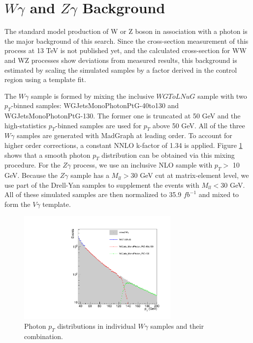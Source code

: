 \documentclass[thesis.tex]{subfiles}
\renewcommand\_{\textunderscore\allowbreak}
\begin{document}
\section{$W\gamma$ and $Z\gamma$ Background}\label{sec:VG}
The standard model production of W or Z boson in association with a photon is the major background of this search. Since the cross-section measurement of this process at 13 TeV is not published yet, and the calculated cross-section for WW and WZ processes show deviations from measured results, this background is estimated by scaling the simulated samples by a factor derived in the control region using a template fit. 

The $W\gamma$ sample is formed by mixing the inclusive $WGToLNuG$ sample with two $p_T$-binned samples: WGJets\_MonoPhoton\_PtG-40to130 and WGJets\_MonoPhoton\_PtG-130. The former one is truncated at 50 GeV and the high-statistics $p_T$-binned samples are used for $p_T$ above 50 GeV. All of the three $W\gamma$ samples are generated with MadGraph at leading order. To account for higher order corrections, a constant NNLO k-factor of 1.34 is applied. Figure \ref{fig:mixWG} shows that a smooth photon $p_{T}$ distribution can be obtained via this mixing procedure. For the $Z\gamma$ process, we use an inclusive NLO sample with $p_T >$ 10 GeV. Because the $Z\gamma$ sample has a $M_{ll} > 30$ GeV cut at matrix-element level, we use part of the Drell-Yan samples to supplement the events with $M_{ll} < 30$ GeV. All of these simulated samples are then normalized to 35.9 $fb^{-1}$ and mixed to form the $V\gamma$ template.

\begin{figure}[!hbt]
  \centering
    \includegraphics[width=0.7\textwidth]{Figures/WGMixing.pdf}
  \caption{Photon $p_T$ distributions in individual $W\gamma$ samples and their combination.}
    \label{fig:mixWG}
\end{figure}
\end{document}
